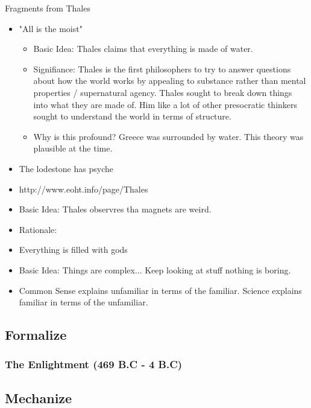\documentclass[twoside]{article}
\begin{document}
Fragments from Thales
\begin{itemize}
  \item "All is the moist"
  \begin{itemize}
    \item Basic Idea: Thales claims that everything is made of water.
    \item Signifiance: Thales is the first philosophers to try to answer questions
          about how the world works by appealing to substance rather than mental
          properties / supernatural agency. Thales sought to break down things into
          what they are made of. Him like a lot of other presocratic thinkers
          sought to understand the world in terms of structure.
    \item Why is this profound? Greece was surrounded by water. This theory
          was plausible at the time.
  \end{itemize}
  \item The lodestone has psyche
    \item http://www.eoht.info/page/Thales
    \item Basic Idea: Thales observres tha magnets are weird.
    \item Rationale:
  \item Everything is filled with gods
    \item Basic Idea: Things are complex... Keep looking at stuff nothing is boring.
    \item Common Sense explains unfamiliar in terms of the familiar.
    Science explains familiar in terms of the unfamiliar.
\end{itemize}



\subsection{Formalize}

\subsubsection{The Enlightment (469 B.C - 4 B.C)}

\subsection{Mechanize}
\end{document}
